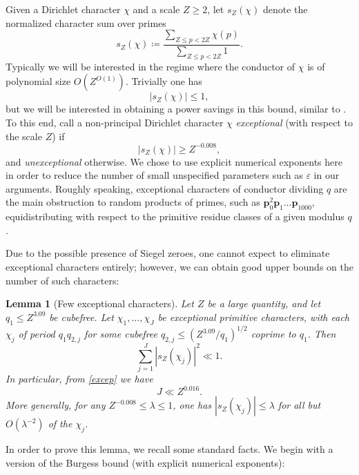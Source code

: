 \documentclass[12pt]{amsart}
\newtheorem{lemma}[theorem]{Lemma}
\newcommand{\eps}{\varepsilon}
\begin{document}
Given a Dirichlet character $\chi$ and a scale $Z \geq 2$, let $s_Z(\chi)$ denote the normalized character sum over primes
\begin{equation}\label{sz-def}
 s_Z(\chi) \coloneqq \frac{\sum_{Z \leq p < 2Z} \chi(p)}{\sum_{Z \leq p < 2Z} 1}.
\end{equation}
Typically we will be interested in the regime where the conductor of $\chi$ is of polynomial size $O(Z^{O(1)})$.  Trivially one has
$$ |s_Z(\chi)| \leq 1,$$
but we will be interested in obtaining a power savings in this bound, similar to .  To this end, call a non-principal Dirichlet character $\chi$ \emph{exceptional} (with respect to the scale $Z$) if
\begin{equation}\label{excep}
    |s_Z(\chi)| \geq Z^{-0.008},
\end{equation}
and \emph{unexceptional} otherwise.
We chose to use explicit numerical exponents here in order to reduce the number of small unspecified parameters such as $\eps$ in our arguments.  Roughly speaking, exceptional characters of conductor dividing $q$ are the main obstruction to random products of primes, such as $\mathbf{p}_0^2 \mathbf{p}_1 \dots \mathbf{p}_{1000}$, equidistributing with respect to the primitive residue classes of a given modulus $q$.

Due to the possible presence of Siegel zeroes, one cannot expect to eliminate exceptional characters entirely; however, we can obtain good upper bounds on the number of such characters:

\begin{lemma}[Few exceptional characters]\label{primesum}  Let $Z$ be a large quantity, and let $q_1 \leq Z^{3.09}$ be cubefree.  Let $\chi_1,\dots,\chi_J$ be exceptional primitive characters, with each $\chi_j$ of period $q_1 q_{2,j}$ for some cubefree $q_{2,j} \leq (Z^{3.09}/q_1)^{1/2}$ coprime to $q_1$.  Then
\begin{equation}\label{jp} \sum_{j=1}^J |s_Z(\chi_j)|^2 \ll 1.
\end{equation}
In particular, from \eqref{excep} we have
\begin{equation}\label{J-bound} J \ll Z^{0.016}. \end{equation}
More generally, for any $Z^{-0.008} \leq \lambda \leq 1$, one has $|s_Z(\chi_j)| \leq \lambda$ for all but $O(\lambda^{-2})$ of the $\chi_j$.
\end{lemma}

In order to prove this lemma, we recall some standard facts.  We begin with a version of the Burgess bound (with explicit numerical exponents):
\end{document}
